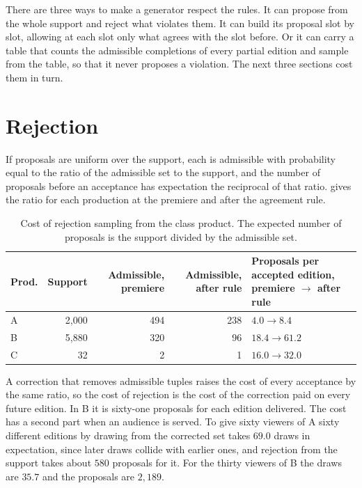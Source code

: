 \documentclass[11pt,twoside,openright]{book}
\theoremstyle{plain}
\theoremstyle{definition}
\theoremstyle{remark}
\begin{document}
There are three ways to make a generator respect the rules. It can propose from the whole support and reject what violates them. It can build its proposal slot by slot, allowing at each slot only what agrees with the slot before. Or it can carry a table that counts the admissible completions of every partial edition and sample from the table, so that it never proposes a violation. The next three sections cost them in turn.

\section{Rejection}\label{sec:reject16}

If proposals are uniform over the support, each is admissible with probability equal to the ratio of the admissible set to the support, and the number of proposals before an acceptance has expectation the reciprocal of that ratio.  gives the ratio for each production at the premiere and after the agreement rule.

\begin{table}[ht]
\centering
\begin{tabular}{@{}lrrrp{3.6cm}@{}}
\toprule
Prod. & Support & Admissible, premiere & Admissible, after rule & Proposals per accepted edition, premiere $\to$ after rule\\
\midrule
A & 2{,}000 & 494 & 238 & $4.0\to8.4$\\
B & 5{,}880 & 320 & 96 & $18.4\to61.2$\\
C & 32 & 2 & 1 & $16.0\to32.0$\\
\bottomrule
\end{tabular}
\caption{Cost of rejection sampling from the class product. The expected number of proposals is the support divided by the admissible set.}\label{tab:rej16}
\end{table}

A correction that removes admissible tuples raises the cost of every acceptance by the same ratio, so the cost of rejection is the cost of the correction paid on every future edition. In B it is sixty-one proposals for each edition delivered. The cost has a second part when an audience is served. To give sixty viewers of A sixty different editions by drawing from the corrected set takes $69.0$ draws in expectation, since later draws collide with earlier ones, and rejection from the support takes about $580$ proposals for it. For the thirty viewers of B the draws are $35.7$ and the proposals are $2{,}189$.
\end{document}
